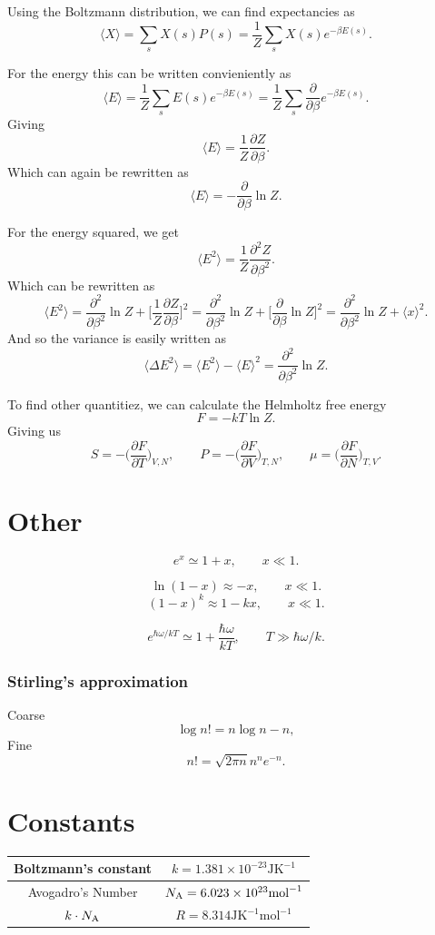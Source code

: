\documentclass[a4paper, 11pt, notitlepage, english]{article}
\newcommand{\p}{\partial}
\begin{document}
Using the Boltzmann distribution, we can find expectancies as
$$\langle X \rangle = \sum_s X(s) P(s) = \frac{1}{Z} \sum_s X(s) e^{-\beta E(s)}.$$

For the energy this can be written convieniently as
$$\langle E \rangle = \frac{1}{Z}\sum_s E(s) e^{-\beta E(s)} = \frac{1}{Z} \sum_s \frac{\p}{\p \beta} e^{-\beta E(s)}.$$
Giving
$$\langle E \rangle = \frac{1}{Z}\frac{\p Z}{\p \beta}. $$
Which can again be rewritten as
$$\langle E \rangle = - \frac{\p }{\p \beta} \ln Z. $$

For the energy squared, we get
$$\langle E^2 \rangle = \frac{1}{Z}\frac{\p^2 Z}{\p \beta^2}.$$
Which can be rewritten as
$$\langle E^2 \rangle = \frac{\p^2}{\p \beta^2} \ln Z + \bigg[\frac{1}{Z} \frac{\p Z}{\p \beta}\bigg]^2 = \frac{\p^2}{\p \beta^2} \ln Z + \bigg[\frac{\p }{\p \beta}\ln Z \bigg]^2 = \frac{\p^2}{\p \beta^2} \ln Z  + \langle x \rangle^2.$$
And so the variance is easily written as
$$\langle \Delta E^2 \rangle = \langle E^2 \rangle - \langle E \rangle^2 = \frac{\p^2}{\p \beta^2} \ln Z.$$


To find other quantitiez, we can calculate the Helmholtz free energy
$$F = -kT \ln Z.$$
Giving us
$$S = -\bigg(\frac{\p F}{\p T}\bigg)_{V, N}, \qquad P = -\bigg(\frac{\p F}{\p V}\bigg)_{T, N}, \qquad \mu = \bigg(\frac{\p F}{\p N}\bigg)_{T, V}.$$


\section*{Other}
$$e^x \simeq 1 + x, \qquad x \ll 1.$$

$$\ln(1-x) \approx -x, \qquad x \ll 1.$$
$$(1-x)^k \approx 1-kx, \qquad x \ll 1.$$


$$e^{\hbar\omega/kT} \simeq 1 + \frac{\hbar \omega}{kT}, \qquad T \gg \hbar\omega/k.$$

\subsubsection*{Stirling's approximation}
Coarse
$$\log n! = n \log n - n,$$
Fine
$$n! = \sqrt{2\pi n} n^n e^{-n}.$$

\section*{Constants}

\begin{center}
\begin{tabular}{|c|c|}	
\hline
Boltzmann's constant & $k = 1.381\times10^{-23} \mbox{JK}^{-1}$ \\ \hline 
Avogadro's Number & $N_{\rm A} = 6.023\times10^{23} \mbox{mol}^{-1}$ \\ \hline 
$k\cdot N_{\rm A}$ & $R = 8.314 \mbox{JK}^{-1}\mbox{mol}^{-1}$ \\ \hline
\end{tabular}
\end{center}
\end{document}
